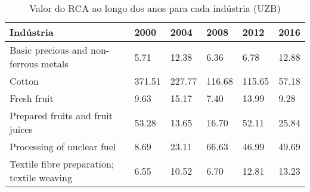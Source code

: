 \begin{table}
\centering
\caption{Valor do RCA ao longo dos anos para cada indústria (UZB)}
\begin{tabular}{p{6cm}p{1.5cm}p{1.5cm}p{1.5cm}p{1.5cm}p{1.5cm}}
\toprule
                                 Indústria &   2000 &   2004 &   2008 &   2012 &  2016 \\
\midrule
     Basic precious and non-ferrous metals &   5.71 &  12.38 &   6.36 &   6.78 & 12.88 \\
                                    Cotton & 371.51 & 227.77 & 116.68 & 115.65 & 57.18 \\
                               Fresh fruit &   9.63 &  15.17 &   7.40 &  13.99 &  9.28 \\
          Prepared fruits and fruit juices &  53.28 &  13.65 &  16.70 &  52.11 & 25.84 \\
                Processing of nuclear fuel &   8.69 &  23.11 &  66.63 &  46.99 & 49.69 \\
Textile fibre preparation; textile weaving &   6.55 &  10.52 &   6.70 &  12.81 & 13.23 \\
\bottomrule
\end{tabular}
\end{table}
